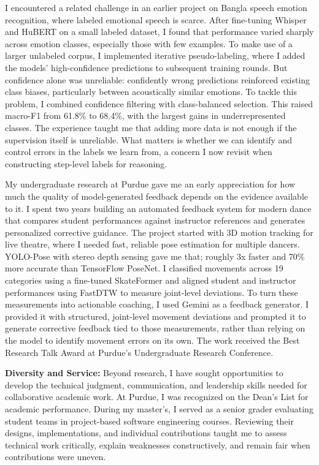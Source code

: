 \documentclass{article}
\begin{document}

I encountered a related challenge in an earlier project on Bangla speech emotion recognition, where labeled emotional speech is scarce. After fine-tuning Whisper and HuBERT on a small labeled dataset, I found that performance varied sharply across emotion classes, especially those with few examples. To make use of a larger unlabeled corpus, I implemented iterative pseudo-labeling, where I added the models’ high-confidence predictions to subsequent training rounds. But confidence alone was unreliable: confidently wrong predictions reinforced existing class biases, particularly between acoustically similar emotions. To tackle this problem, I combined confidence filtering with class-balanced selection. This raised macro-F1 from 61.8\% to 68.4\%, with the largest gains in underrepresented classes. The experience taught me that adding more data is not enough if the supervision itself is unreliable. What matters is whether we can identify and control errors in the labels we learn from, a concern I now revisit when constructing step-level labels for reasoning.


My undergraduate research at Purdue gave me an early appreciation for how much the quality of model-generated feedback depends on the evidence available to it. I spent two years building an automated feedback system for modern dance that compares student performances against instructor references and generates personalized corrective guidance. The project started with 3D motion tracking for live theatre, where I needed fast, reliable pose estimation for multiple dancers. YOLO-Pose with stereo depth sensing gave me that; roughly 3x faster and 70\% more accurate than TensorFlow PoseNet. I classified movements across 19 categories using a fine-tuned SkateFormer and aligned student and instructor performances using FastDTW to measure joint-level deviations. To turn these measurements into actionable coaching, I used Gemini as a feedback generator. I provided it with structured, joint-level movement deviations and prompted it to generate corrective feedback tied to those measurements, rather than relying on the model to identify movement errors on its own. The work received the Best Research Talk Award at Purdue’s Undergraduate Research Conference.

\textbf{Diversity and Service: }Beyond research, I have sought opportunities to develop the technical judgment, communication, and leadership skills needed for collaborative academic work. At Purdue, I was recognized on the Dean's List for academic performance. During my master's, I served as a senior grader evaluating student teams in project-based software engineering courses. Reviewing their designs, implementations, and individual contributions taught me to assess technical work critically, explain weaknesses constructively, and remain fair when contributions were uneven.
\end{document}
